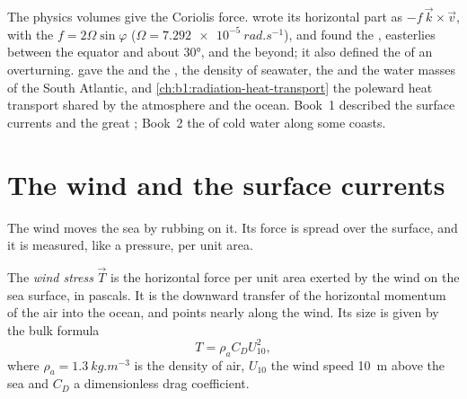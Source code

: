 \begin{recall}
The physics volumes give the Coriolis force. 
wrote its horizontal part as $-f\,\vec k\times\vec v$, with the 
$f = 2\Omega\sin\varphi$ ($\Omega = \qty{7.292e-5}{rad.s^{-1}}$), and found the
, easterlies between the equator and about \ang{30}, and the 
beyond; it also defined the  of an overturning.
 gave the  and the , the
density of seawater, the  and the water masses of the South Atlantic,
and \cref{ch:b1:radiation-heat-transport} the poleward heat transport shared by the
atmosphere and the ocean. Book~1 described the surface currents and the great
; Book~2 the  of cold water along some coasts.
\end{recall}

\section{The wind and the surface currents}\label{sec:b1:ocean-circulation:wind}

The wind moves the sea by rubbing on it. Its force is spread over the surface, and
it is measured, like a pressure, per unit area.

\begin{definition}\label{def:b1:ocean-circulation:wind-stress}
The \emph{wind stress} $\vec T$ is the horizontal force per unit
area exerted by the wind on the sea surface, in pascals. It is the downward transfer
of the horizontal momentum of the air into the ocean, and points nearly along the
wind. Its size is given by the bulk formula
\[
  T = \rho_a C_D U_{10}^2,
\]
where $\rho_a = \qty{1.3}{kg.m^{-3}}$ is the density of air, $U_{10}$ the wind speed
\qty{10}{m} above the sea and $C_D$ a dimensionless drag coefficient.
\end{definition}

